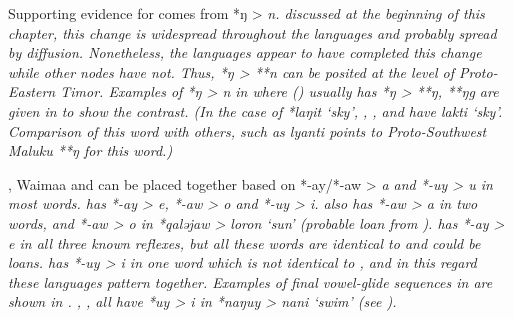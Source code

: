 \newpage
Supporting evidence for  comes from *ŋ > \it{n}.
 discussed at the beginning of this chapter,
this change is widespread throughout the  languages
and probably spread by diffusion.
Nonetheless, the  languages appear to have
completed this change while other nodes have not.
Thus, *ŋ > **n can be posited at the level of Proto-Eastern Timor.
 Examples of *ŋ > \it{n} in  where 
() usually has *ŋ > **ŋ,
**ŋg are given in  to show the contrast.
(In the case of *laŋit ‘sky’,
, , and  have \it{lakti} ‘sky’.
Comparison of this word with others, such as  \it{lyanti}
points to Proto-Southwest Maluku **ŋ for this word.) 

, Waima{\Q}a and  can be placed together based on
*-ay/*-aw > \it{a} and *-uy > \it{u} in most words.
 has *-ay > \it{e},
*-aw > \it{o} and *-uy > \it{i}.
 also has *-aw > \it{a} in two words,
and *-aw > \it{o} in *qaləjaw > \it{loron} ‘sun’ (probable loan from ).
 has *-ay > \it{e} in all three known reflexes,
but all these words are identical to 
and could be loans.
 has *-uy > \it{i} in one word which is not identical to
, and in this regard these languages pattern together.
Examples of final vowel-glide sequences in 
are shown in .
, ,  all have *uy > \it{i} in *naŋuy > \it{nani}
‘swim’ (see ).

